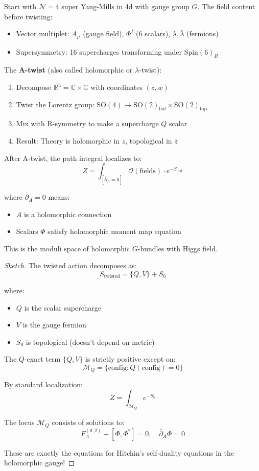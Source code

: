 \begin{definition}[A-Twisted 4d $\mathcal{N}=4$ SYM]
Start with $\mathcal{N}=4$ super Yang-Mills in 4d with gauge group $G$. The 
field content before twisting:
\begin{itemize}
\item Vector multiplet: $A_\mu$ (gauge field), $\Phi^I$ (6 scalars), $\lambda, 
\bar{\lambda}$ (fermions)
\item Supersymmetry: 16 supercharges transforming under $\text{Spin}(6)_R$
\end{itemize}

The \textbf{A-twist} (also called holomorphic or $\lambda$-twist):
\begin{enumerate}
\item Decompose $\mathbb{R}^4 = \mathbb{C} \times \mathbb{C}$ with coordinates 
$(z, w)$
\item Twist the Lorentz group: $\text{SO}(4) \to \text{SO}(2)_{\text{hol}} \times 
\text{SO}(2)_{\text{top}}$
\item Mix with R-symmetry to make a supercharge $Q$ scalar
\item Result: Theory is holomorphic in $z$, topological in $\bar{z}$
\end{enumerate}
\end{definition}

\begin{theorem}
After A-twist, the path integral localizes to:
$$Z = \int_{[\bar{\partial}_A = 0]} \mathcal{O}(\text{fields}) \cdot e^{-S_{\text{inst}}}$$

where $\bar{\partial}_A = 0$ means:
\begin{itemize}
\item $A$ is a holomorphic connection
\item Scalars $\Phi$ satisfy holomorphic moment map equation
\end{itemize}

This is the moduli space of holomorphic $G$-bundles with Higgs field.
\end{theorem}

\begin{proof}[Sketch]
The twisted action decomposes as:
$$S_{\text{twisted}} = \{Q, V\} + S_0$$

where:
\begin{itemize}
\item $Q$ is the scalar supercharge
\item $V$ is the gauge fermion
\item $S_0$ is topological (doesn't depend on metric)
\end{itemize}

The $Q$-exact term $\{Q, V\}$ is strictly positive except on:
$$\mathcal{M}_Q = \{\text{config} : Q(\text{config}) = 0\}$$

By standard localization:
$$Z = \int_{\mathcal{M}_Q} e^{-S_0}$$

The locus $\mathcal{M}_Q$ consists of solutions to:
$$F_{A}^{(0,2)} + [\Phi, \Phi^*] = 0, \quad \bar{\partial}_A \Phi = 0$$

These are exactly the equations for Hitchin's self-duality equations in the 
holomorphic gauge!
\end{proof}

